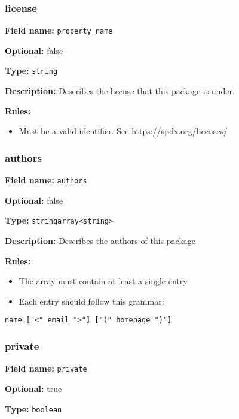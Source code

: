 \hypertarget{license}{\subsubsection{license}\label{license}}

\textbf{Field name:} \texttt{property\_name}

\textbf{Optional:} false

\textbf{Type:} \texttt{string}

\textbf{Description:} Describes the license that this package is under.

\textbf{Rules:}

\begin{itemize}
\tightlist
\item
  Must be a valid identifier. See https://spdx.org/licenses/
\end{itemize}

\hypertarget{authors}{\subsubsection{authors}\label{authors}}

\textbf{Field name:} \texttt{authors}

\textbf{Optional:} false

\textbf{Type:}
\texttt{string\textbar{}array\textless{}string\textgreater{}}

\textbf{Description:} Describes the authors of this package

\textbf{Rules:}

\begin{itemize}
\tightlist
\item
  The array must contain at least a single entry
\item
  Each entry should follow this grammar:
\end{itemize}

\begin{verbatim}
name ["<" email ">"] ["(" homepage ")"]
\end{verbatim}

\hypertarget{private}{\subsubsection{private}\label{private}}

\textbf{Field name:} \texttt{private}

\textbf{Optional:} true

\textbf{Type:} \texttt{boolean}

